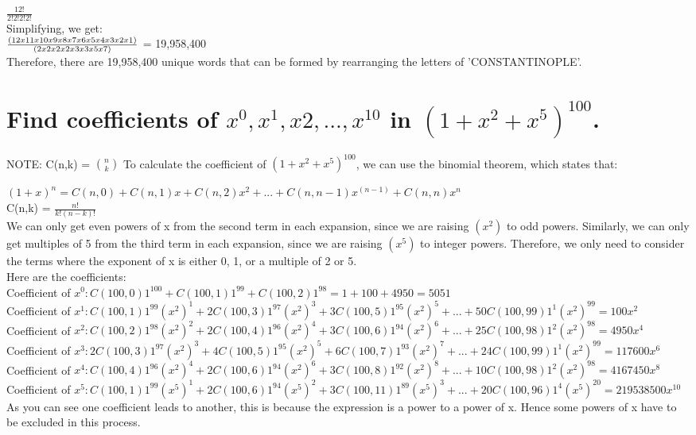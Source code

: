 \documentclass{article}
\begin{document}
$\frac{12!}{2!2!2!2!}$\\
Simplifying, we get:\\

$\frac{(12 x 11 x 10 x 9 x 8 x 7 x 6 x 5 x 4 x 3 x 2 x 1)}{(2 x 2 x 2 x 2 x 3 x 3 x 5 x 7)}\\ $ = 19,958,400\\
Therefore, there are 19,958,400 unique words that can be formed by rearranging the letters of 'CONSTANTINOPLE'.\\
\hline

\section{Find coefficients of $x^0,x^1,x2, . . . ,x^10$ in $(1+x^2+x^5)^{100}$.}
NOTE: C(n,k) = $n \choose k$
To calculate the coefficient of $(1+x^2+x^5)^{100}$, we can use the binomial theorem, which states that:

$(1+x)^n = C(n,0) + C(n,1)x + C(n,2)x^2 + ... + C(n,n-1)x^(n-1) + C(n,n)x^n$\\
C(n,k) = $\frac{n!}{k!(n-k)!}$\\
We can only get even powers of x from the second term in each expansion, since we are raising $(x^2)$ to odd powers. Similarly, we can only get multiples of 5 from the third term in each expansion, since we are raising $(x^5)$ to integer powers. Therefore, we only need to consider the terms where the exponent of x is either 0, 1, or a multiple of 2 or 5.\\
Here are the coefficients:\\
Coefficient of $x^0: C(100,0)1^{100} + C(100,1)1^{99} + C(100,2)1^{98} = 1 + 100 + 4950 = 5051$\\

Coefficient of $x^1: C(100,1)1^{99} (x^2)^1 + 2C(100,3)1^{97} (x^2)^3 + 3C(100,5)1^{95} (x^2)^5 + ... + 50C(100,99)1^1 (x^2)^{99} = 100x^2$\\

Coefficient of $x^2: C(100,2)1^{98} (x^2)^2 + 2C(100,4)1^{96} (x^2)^4 + 3C(100,6)1^{94} (x^2)^6 + ... + 25C(100,98)1^2 (x^2)^{98} = 4950x^4$\\

Coefficient of $x^3: 2C(100,3)1^{97} (x^2)^3 + 4C(100,5)1^{95} (x^2)^5 + 6C(100,7)1^{93} (x^2)^7 + ... + 24C(100,99)1^1 (x^2)^{99} = 117600x^6$\\

Coefficient of $x^4: C(100,4)1^{96} (x^2)^4 + 2C(100,6)1^{94} (x^2)^6 + 3C(100,8)1^{92} (x^2)^8 + ... + 10C(100,98)1^2 (x^2)^{98} = 4167450x^8$\\

Coefficient of $x^5: C(100,1)1^{99} (x^5)^1 + 2C(100,6)1^{94} (x^5)^2 + 3C(100,11)1^{89} (x^5)^3 + ... + 20C(100,96)1^4 (x^5)^20 = 219538500x^{10}$
As you can see one coefficient leads to another, this is because the expression is a power to a power of x. Hence some powers of x have to be excluded in this process.
\hline
\end{document}
